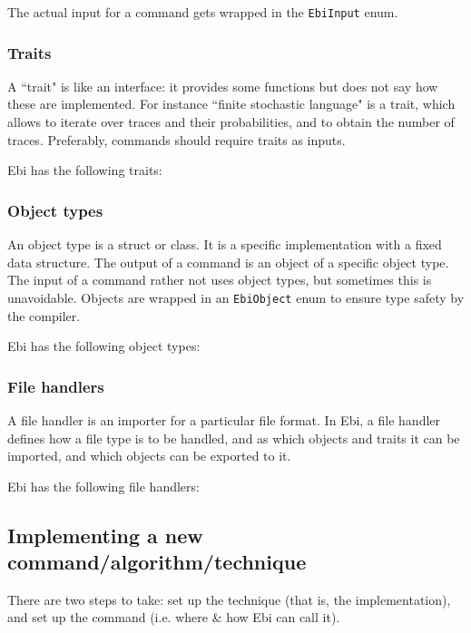 \documentclass{article}
\begin{document}
            The actual input for a command gets wrapped in the \texttt{EbiInput} enum.
    
        \subsubsection{Traits}
        \label{sec:traits}
            A ``trait" is like an interface: it provides some functions but does not say how these are implemented.
            For instance ``finite stochastic language" is a trait, which allows to iterate over traces and their probabilities, and to obtain the number of traces.
            Preferably, commands should require traits as inputs.

            Ebi has the following traits:
            \ebitraitlist
    
        \subsubsection{Object types}
        \label{sec:objecttypes}
            An object type is a struct or class.
            It is a specific implementation with a fixed data structure.
            The output of a command is an object of a specific object type.
            The input of a command rather not uses object types, but sometimes this is unavoidable.
            Objects are wrapped in an \texttt{EbiObject} enum to ensure type safety by the compiler.

            Ebi has the following object types:
            \ebiobjecttypelist
    
        \subsubsection{File handlers}
            A file handler is an importer for a particular file format.
            In Ebi, a file handler defines how a file type is to be handled, and as which objects and traits it can be imported, and which objects can be exported to it.
    
            Ebi has the following file handlers:
            \ebifilehandlerlist
            
	\subsection{Implementing a new command/algorithm/technique}
	\label{sec:implement}
		There are two steps to take: set up the technique (that is, the implementation), and set up the command (i.e. where \& how Ebi can call it).
		
\end{document}

